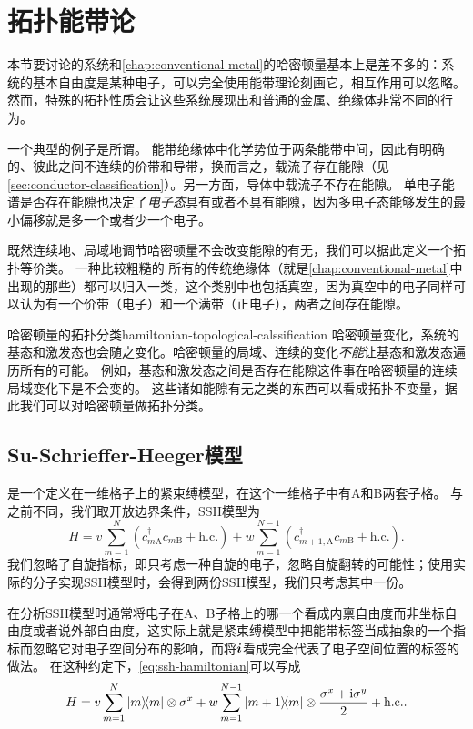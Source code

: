 \chapter{拓扑能带论}

本节要讨论的系统和\autoref{chap:conventional-metal}的哈密顿量基本上是差不多的：系统的基本自由度是某种电子，可以完全使用能带理论刻画它，相互作用可以忽略。
然而，特殊的拓扑性质会让这些系统展现出和普通的金属、绝缘体非常不同的行为。

一个典型的例子是所谓。
能带绝缘体中化学势位于两条能带中间，因此有明确的、彼此之间不连续的价带和导带，换而言之，载流子存在能隙（见\autoref{sec:conductor-classification}）。另一方面，导体中载流子不存在能隙。
单电子能谱是否存在能隙也决定了\emph{电子态}具有或者不具有能隙，因为多电子态能够发生的最小偏移就是多一个或者少一个电子。

既然连续地、局域地调节哈密顿量不会改变能隙的有无，我们可以据此定义一个拓扑等价类。
一种比较粗糙的
所有的传统绝缘体（就是\autoref{chap:conventional-metal}中出现的那些）都可以归入一类，这个类别中也包括真空，因为真空中的电子同样可以认为有一个价带（电子）和一个满带（正电子），两者之间存在能隙。

\begin{back}{哈密顿量的拓扑分类}{hamiltonian-topological-calssification}
    哈密顿量变化，系统的基态和激发态也会随之变化。哈密顿量的局域、连续的变化\emph{不能}让基态和激发态遍历所有的可能。
    例如，基态和激发态之间是否存在能隙这件事在哈密顿量的连续局域变化下是不会变的。
    这些诸如能隙有无之类的东西可以看成拓扑不变量，据此我们可以对哈密顿量做拓扑分类。
\end{back}

\section{Su-Schrieffer-Heeger模型}

是一个定义在一维格子上的紧束缚模型，在这个一维格子中有A和B两套子格。
与之前不同，我们取开放边界条件，SSH模型为
\begin{equation}
    H = v \sum_{m=1}^N (c^\dagger_{m \text{A}} c_{m \text{B}} + \text{h.c.}) + w \sum_{m=1}^{N-1} (c^\dagger_{m+1, \text{A}} c_{m \text{B}} +  \text{h.c.}).
    \label{eq:ssh-hamiltonian}
\end{equation}
我们忽略了自旋指标，即只考虑一种自旋的电子，忽略自旋翻转的可能性；使用实际的分子实现SSH模型时，会得到两份SSH模型，我们只考虑其中一份。

在分析SSH模型时通常将电子在A、B子格上的哪一个看成内禀自由度而非坐标自由度或者说外部自由度，这实际上就是紧束缚模型中把能带标签当成抽象的一个指标而忽略它对电子空间分布的影响，而将$\vb*{i}$看成完全代表了电子空间位置的标签的做法。
在这种约定下，\eqref{eq:ssh-hamiltonian}可以写成
\begin{equation}
    H = v \sum_{m=1}^N \dyad{m} \otimes \sigma^x + w \sum_{m=1}^{N-1} \dyad{m+1}{m} \otimes \frac{\sigma^x + \ii \sigma^y}{2} + \text{h.c.}. 
\end{equation}

